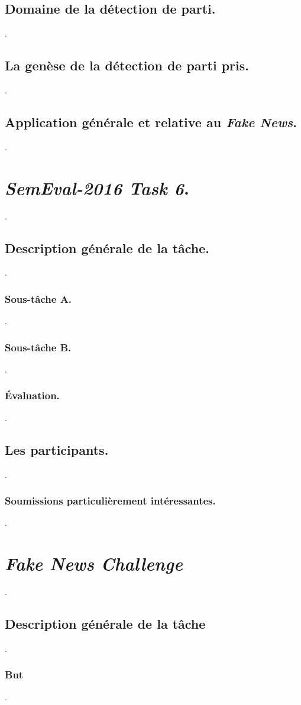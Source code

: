 \documentclass[onecolumn, 12pt]{article}
\begin{document}
  \subsection{Domaine de la détection de parti.}
.
  \subsection{La genèse de la détection de parti pris.}
.
  \subsection{Application générale et relative au \textit{Fake News}.}
.
\section{\textit{SemEval-2016 Task 6}.}
.
  \subsection{Description générale de la tâche.}
.
    \subsubsection{Sous-tâche A.}
.
    \subsubsection{Sous-tâche B.}
.
    \subsubsection{Évaluation.}
.
  \subsection{Les participants.}
.
    \subsubsection{Soumissions particulièrement intéressantes.}
.
\section{\textit{Fake News Challenge}}
.
  \subsection{Description générale de la tâche}
.
    \subsubsection{But}
.
\end{document}
